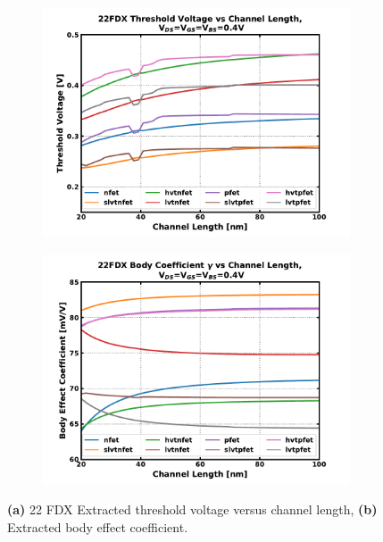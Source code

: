 		\begin{figure}[htb!]
		    \centering
		    \begin{subfigure}{0.5\textwidth}
		        \centering
		        \includegraphics[width=1\textwidth, angle=0]{./figs/design/vth}
		        \caption{ }
		        \label{fig:vth_vs_len}
		    \end{subfigure}%
		    \begin{subfigure}{0.5\textwidth}
		        \centering
		        \includegraphics[width=1\textwidth, angle=0]{./figs/design/gamma}
		        \caption{ }
		        \label{fig:gamma_vs_len}
		    \end{subfigure}
		    \label{fig:vth_groupb}
		    \caption{\textbf{(a)} 22 FDX Extracted threshold voltage versus channel length, \textbf{(b)} Extracted body effect coefficient.}
		\end{figure} 



